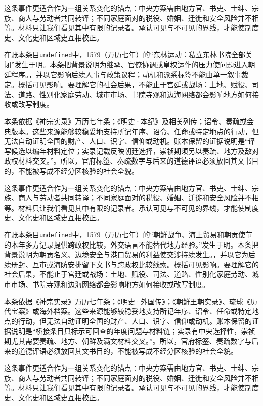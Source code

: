 这条事件更适合作为一组关系变化的锚点：中央方案需由地方官、书吏、士绅、宗族、商人与劳动者共同转译；不同家庭面对的税役、婚姻、迁徙和安全风险并不相等。材料只让我们看见其中有限的记录者。承认可见与不可见的界线，才能使制度史、文化史和区域史互相校正。

在账本条目\texttt{undefined}中，1579（万历七年）的“东林运动：私立东林书院全部关闭”发生于明。本条把背景说明为继承、官僚协调或皇权运作的压力使问题进入朝廷程序。，并以它影响后续人事与政策议程；动机和派系标签不能由单一叙事裁定。概括可见影响。要理解它的社会后果，不能止于宫廷或战场：土地、赋役、司法、道路、性别化家庭劳动、城市市场、书院寺观和边海网络都会影响地方如何接收或改写制度。

本条依据《神宗实录》万历七年条；《明史·本纪》及相关列传；诏令、奏疏或会典版本。这些来源能够较稳妥地支持所记年序、诏令、任命或特定地点的行动，但无法自动证明全国的财产、人口、识字、信仰或动机。账本保留的证据说明是“译写候选以编年材料定位；实录记载反映朝廷选择，崇祯期须另以奏疏、地方及敌对政权材料交叉。”。所以，官府标签、奏疏数字与后来的道德评语必须放回其文书目的，不能被写成不经分区核验的社会全貌。

这条事件更适合作为一组关系变化的锚点：中央方案需由地方官、书吏、士绅、宗族、商人与劳动者共同转译；不同家庭面对的税役、婚姻、迁徙和安全风险并不相等。材料只让我们看见其中有限的记录者。承认可见与不可见的界线，才能使制度史、文化史和区域史互相校正。

在账本条目\texttt{undefined}中，1579（万历七年）的“朝鲜战争、海上贸易和朝贡使节的本年多方记录提供跨政权比较，外交语言不能替代地方经验。”发生于明。本条把背景说明为朝贡名义、边境安全与港口贸易的利益使交涉持续发生。，并以它为后续册封、互市或海防安排留下文书与跨政权比较线索。概括可见影响。要理解它的社会后果，不能止于宫廷或战场：土地、赋役、司法、道路、性别化家庭劳动、城市市场、书院寺观和边海网络都会影响地方如何接收或改写制度。

本条依据《神宗实录》万历七年条；《明史·外国传》；《朝鲜王朝实录》、琉球《历代宝案》或海外档案。这些来源能够较稳妥地支持所记年序、诏令、任命或特定地点的行动，但无法自动证明全国的财产、人口、识字、信仰或动机。账本保留的证据说明是“桥接条目只标示可回查的年度问题与材料链；实录有中央选择性，崇祯期尤其需要奏疏、地方、朝鲜及满文材料交叉。”。所以，官府标签、奏疏数字与后来的道德评语必须放回其文书目的，不能被写成不经分区核验的社会全貌。

这条事件更适合作为一组关系变化的锚点：中央方案需由地方官、书吏、士绅、宗族、商人与劳动者共同转译；不同家庭面对的税役、婚姻、迁徙和安全风险并不相等。材料只让我们看见其中有限的记录者。承认可见与不可见的界线，才能使制度史、文化史和区域史互相校正。

